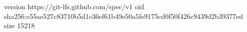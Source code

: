 version https://git-lfs.github.com/spec/v1
oid sha256:e55ae527c83710b5d1c36ef61b49e50a5fe9175cd0f50f426c9439d2b39377ed
size 15218
